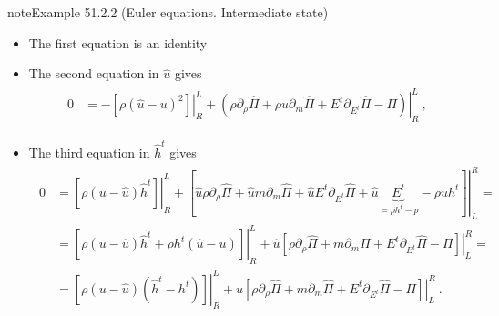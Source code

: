 \documentclass[letterpaper,10pt,english]{jupyterBook}
\begin{document}
\begin{sphinxadmonition}{note}{Example 51.2.2 (Euler equations. Intermediate state)}
\begin{itemize}
\item {} 
\sphinxAtStartPar
The first equation is an identity

\item {} 
\sphinxAtStartPar
The second equation in \(\hat{u}\) gives
\begin{equation*}
\begin{split}\begin{aligned}
     0 
     & = - \left.\left[ \rho ( \hat{u} - u )^2 \right]\right|_R^L +  \left.\left( \rho \partial_\rho \hat{\Pi} + \rho u \partial_m \hat{\Pi} + E^t \partial_{E^t} \hat{\Pi} - \Pi \right)\right|_{R}^{L} \ ,
   \end{aligned}\end{split}
\end{equation*}
\item {} 
\sphinxAtStartPar
The third equation in \(\hat{h}^t\) gives
\begin{equation*}
\begin{split}\begin{aligned}
     0 
     & = \left.\left[ \rho ( u - \hat{u} ) \hat{h}^t \right]\right|_R^L + \left.\left[ \hat{u} \rho \partial_\rho \hat{\Pi} + \hat{u} m \partial_m \hat{\Pi} + \hat{u} E^t \partial_{E^t} \hat{\Pi} + \hat{u} \underbrace{E^t}_{= \rho h^t - p} - \rho u h^t \right]\right|_L^R = \\
     & = \left.\left[ \rho ( u - \hat{u} ) \hat{h}^t + \rho h^t ( \hat{u} - u ) \right]\right|_R^L + \hat{u} \left.\left[ \rho \partial_\rho \hat{\Pi} + m \partial_m \hat{\Pi} + E^t \partial_{E^t} \hat{\Pi} - \Pi \right]\right|_L^R = \\ 
     & = \left.\left[ \rho ( u - \hat{u} ) ( \hat{h}^t - h^t ) \right]\right|_R^L + \hat{u} \left.\left[ \rho \partial_\rho \hat{\Pi} + m \partial_m \hat{\Pi} + E^t \partial_{E^t} \hat{\Pi} - \Pi \right]\right|_L^R \ .
   \end{aligned}\end{split}
\end{equation*}
\end{itemize}


\end{sphinxadmonition}
\end{document}
